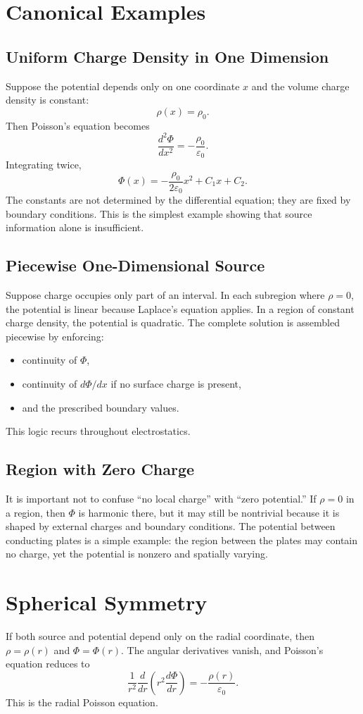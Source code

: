 \documentclass[12pt]{article}
\begin{document}
\section{Canonical Examples}

\subsection{Uniform Charge Density in One Dimension}
Suppose the potential depends only on one coordinate $x$ and the volume charge density is constant:
\[
\rho(x)=\rho_0.
\]
Then Poisson's equation becomes
\[
\frac{d^2\Phi}{dx^2}=-\frac{\rho_0}{\varepsilon_0}.
\]
Integrating twice,
\[
\Phi(x)=-\frac{\rho_0}{2\varepsilon_0}x^2+C_1x+C_2.
\]
The constants are not determined by the differential equation; they are fixed by boundary conditions. This is the simplest example showing that source information alone is insufficient.

\subsection{Piecewise One-Dimensional Source}
Suppose charge occupies only part of an interval. In each subregion where $\rho=0$, the potential is linear because Laplace's equation applies. In a region of constant charge density, the potential is quadratic. The complete solution is assembled piecewise by enforcing:
\begin{itemize}
\item continuity of $\Phi$,
\item continuity of $d\Phi/dx$ if no surface charge is present,
\item and the prescribed boundary values.
\end{itemize}
This logic recurs throughout electrostatics.

\subsection{Region with Zero Charge}
It is important not to confuse ``no local charge'' with ``zero potential.'' If $\rho=0$ in a region, then $\Phi$ is harmonic there, but it may still be nontrivial because it is shaped by external charges and boundary conditions. The potential between conducting plates is a simple example: the region between the plates may contain no charge, yet the potential is nonzero and spatially varying.

\section{Spherical Symmetry}
If both source and potential depend only on the radial coordinate, then $\rho=\rho(r)$ and $\Phi=\Phi(r)$. The angular derivatives vanish, and Poisson's equation reduces to
\[
\frac{1}{r^2}\frac{d}{dr}\left(r^2\frac{d\Phi}{dr}\right)
=
-\frac{\rho(r)}{\varepsilon_0}.
\]
This is the radial Poisson equation.
\end{document}
